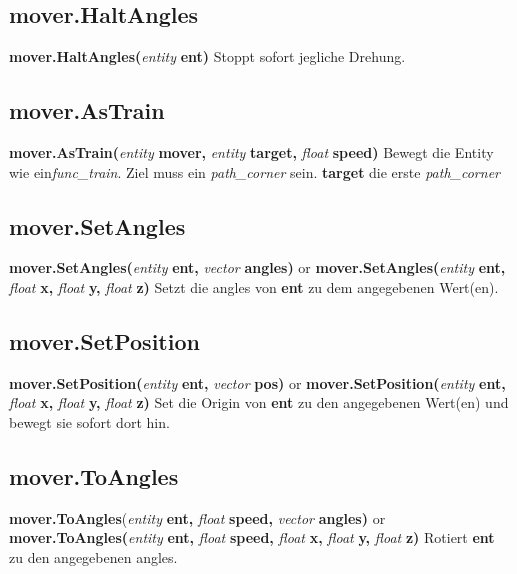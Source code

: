 \documentclass[11pt,a4paper]{book}
\begin{document}
\subsection{mover.HaltAngles}
\label{mver-haltangles}
\textbf{mover.HaltAngles(}\textit{entity}\textbf{ ent)}
\newline
Stoppt sofort jegliche Drehung.
\subsection{mover.AsTrain}
\label{mver-astrain}
\textbf{mover.AsTrain(}\textit{entity}\textbf{ mover, }\textit{entity}\textbf{ target, }\textit{float}\textbf{ speed)}
\newline
Bewegt die Entity wie ein\textit{func\_train}. Ziel muss ein \textit{path\_corner} sein.
\newline
\textbf{target} die erste \textit{path\_corner}
\subsection{mover.SetAngles}
\label{mver-setangles}
\textbf{mover.SetAngles(}\textit{entity}\textbf{ ent, }\textit{vector}\textbf{ angles)} or \textbf{mover.SetAngles(}\textit{entity}\textbf{ ent, }\textit{float}\textbf{ x, }\textit{float}\textbf{ y, }\textit{float}\textbf{ z)}
\newline
Setzt die angles von \textbf{ent} zu dem angegebenen Wert(en).
\subsection{mover.SetPosition}
\label{mver-setposition}
\textbf{mover.SetPosition(}\textit{entity}\textbf{ ent, }\textit{vector}\textbf{ pos)} or \textbf{mover.SetPosition(}\textit{entity}\textbf{ ent, }\textit{float}\textbf{ x, }\textit{float}\textbf{ y, }\textit{float}\textbf{ z)}
\newline
Set die Origin von \textbf{ent} zu den angegebenen Wert(en) und bewegt sie sofort dort hin.
\subsection{mover.ToAngles}
\label{mver-toangles}
\textbf{mover.ToAngles}(\textit{entity}\textbf{ ent, }\textit{float}\textbf{ speed, }\textit{vector}\textbf{ angles)} or \textbf{mover.ToAngles(}\textit{entity}\textbf{ ent, }\textit{float}\textbf{ speed, }\textit{float}\textbf{ x, }\textit{float}\textbf{ y, }\textit{float}\textbf{ z)}
\newline
Rotiert \textbf{ent} zu den angegebenen angles.
\end{document}

